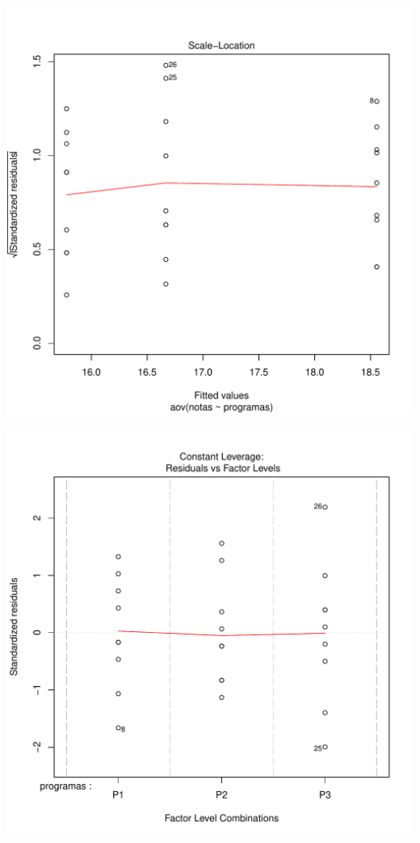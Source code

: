 \documentclass[12pt,letterpaper]{article}\usepackage[]{graphicx}\usepackage[]{color}
\makeatletter
\def\maxwidth{ %
  \ifdim\Gin@nat@width>\linewidth
    \linewidth
  \else
    \Gin@nat@width
  \fi
}
\newenvironment{knitrout}{}{} %
\makeatother
\begin{document}
\begin{itemize}
\begin{knitrout}
\includegraphics[width=\maxwidth]{figure/unnamed-chunk-2-3} 

\includegraphics[width=\maxwidth]{figure/unnamed-chunk-2-4} 

\end{knitrout}

\end{itemize}
\end{document}
